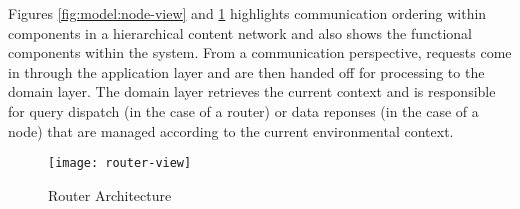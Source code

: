 Figures \ref{fig:model:node-view} and \ref{fig:model:router-view} highlights communication ordering within components in a hierarchical content network and also shows the functional components within the system.  From a communication perspective, requests come in through the application layer and are then handed off for processing to the domain layer.  The domain layer retrieves the current context and is responsible for query dispatch (in the case of a router) or data reponses (in the case of a node) that are managed according to the current environmental context.

\begin{figure}[!t]
\centering
\texttt{[image: router-view]}
\caption{Router Architecture}
\label{fig:model:router-view}
\end{figure}